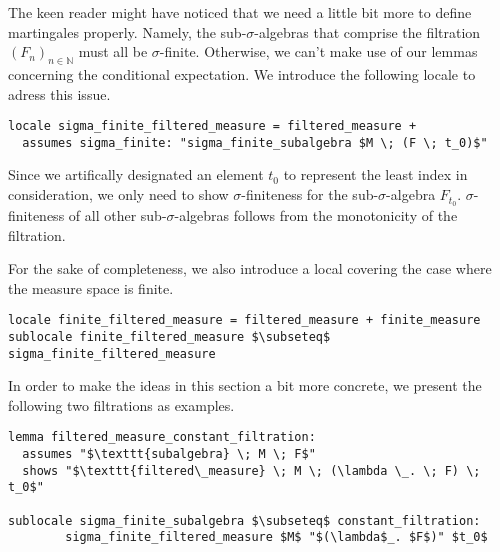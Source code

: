 The keen reader might have noticed that we need a little bit more to define martingales properly. Namely, the sub-$\sigma$-algebras that comprise the filtration $(F_n)_{n \in \mathbb{N}}$ must all be $\sigma$-finite. Otherwise, we can't make use of our lemmas concerning the conditional expectation. We introduce the following locale to adress this issue.

\begin{isadefinition}
{\small
\begin{lstlisting}[style=isabelle]
locale sigma_finite_filtered_measure = filtered_measure +
  assumes sigma_finite: "sigma_finite_subalgebra $M \; (F \; t_0)$"
  \end{lstlisting}
}
\end{isadefinition}

\begin{remark}
	Since we artifically designated an element $t_0$ to represent the least index in consideration, we only need to show $\sigma$-finiteness for the sub-$\sigma$-algebra $F_{t_0}$. $\sigma$-finiteness of all other sub-$\sigma$-algebras follows from the monotonicity of the filtration.
\end{remark}

For the sake of completeness, we also introduce a local covering the case where the measure space is finite.

\begin{isadefinition}
{\small
\begin{lstlisting}[style=isabelle]
locale finite_filtered_measure = filtered_measure + finite_measure
sublocale finite_filtered_measure $\subseteq$ sigma_finite_filtered_measure 

  \end{lstlisting}
}
\end{isadefinition}


In order to make the ideas in this section a bit more concrete, we present the following two filtrations as examples.

\begin{isalemma}
{\small
\begin{lstlisting}[style=isabelle]
lemma filtered_measure_constant_filtration:
  assumes "$\texttt{subalgebra} \; M \; F$"
  shows "$\texttt{filtered\_measure} \; M \; (\lambda \_. \; F) \; t_0$"

sublocale sigma_finite_subalgebra $\subseteq$ constant_filtration: 
		sigma_finite_filtered_measure $M$ "$(\lambda$_. $F$)" $t_0$
\end{lstlisting}
}
\end{isalemma}

